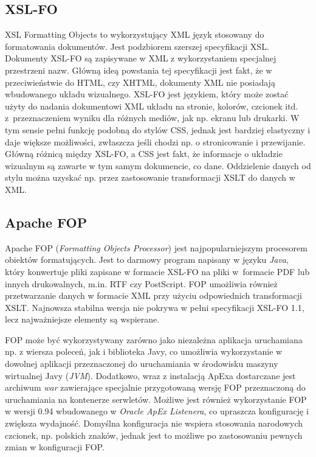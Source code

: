 \documentclass[11pt,a4paper]{article}
\begin{document}
\subsection{XSL-FO} \label{tools:xslfo}
XSL Formatting Objects to wykorzystujący XML język stosowany do formatowania dokumentów. Jest podzbiorem szerszej specyfikacji XSL. Dokumenty XSL-FO są zapisywane w XML z wykorzystaniem specjalnej przestrzeni nazw. Główną ideą powstania tej specyfikacji jest fakt, że w przeciwieństwie do HTML, czy XHTML, dokumenty XML nie posiadają wbudowanego układu wizualnego. XSL-FO jest językiem, który może zostać użyty do nadania dokumentowi XML układu na stronie, kolorów, czcionek itd. z~przeznaczeniem wyniku dla różnych mediów, jak np. ekranu lub drukarki. W tym sensie pełni funkcję podobną do stylów CSS, jednak jest bardziej elastyczny i daje większe możliwości, zwłaszcza jeśli chodzi np. o stronicowanie i przewijanie. Główną różnicą między XSL-FO, a CSS jest fakt, że informacje o układzie wizualnym są zawarte w tym samym dokumencie, co dane. Oddzielenie danych od stylu można uzyskać np. przez zastosowanie transformacji XSLT do danych w XML.

\subsection{Apache FOP} \label{tools:fop}
Apache FOP (\emph{Formatting Objects Processor}) jest najpopularniejszym procesorem obiektów formatujących. Jest to darmowy program napisany w języku \emph{Java}, który konwertuje pliki zapisane w formacie XSL-FO na pliki w~formacie PDF lub innych drukowalnych, m.in. RTF czy PostScript. FOP umożliwia również przetwarzanie danych w formacie XML przy użyciu odpowiednich transformacji XSLT. Najnowsza stabilna wersja nie pokrywa w pełni specyfikacji XSL-FO 1.1, lecz najważniejsze elementy są wspierane.

FOP może być wykorzystywany zarówno jako niezależna aplikacja uruchamiana np. z wiersza poleceń, jak i biblioteka Javy, co umożliwia wykorzystanie w dowolnej aplikacji przeznaczonej do uruchamiania w środowisku maszyny wirtualnej Javy (\emph{JVM}). Dodatkowo, wraz z instalacją ApExa dostarczane jest archiwum \emph{war} zawierające specjalnie przygotowaną wersję FOP przeznaczoną do uruchamiania na kontenerze serwletów. Możliwe jest również wykorzystanie FOP w wersji 0.94 wbudowanego w \emph{Oracle ApEx Listenera}, co upraszcza konfigurację i zwiększa wydajność. Domyślna konfiguracja nie wspiera stosowania narodowych czcionek, np. polskich znaków, jednak jest to możliwe po zastosowaniu pewnych zmian w konfiguracji FOP. 
\end{document}
